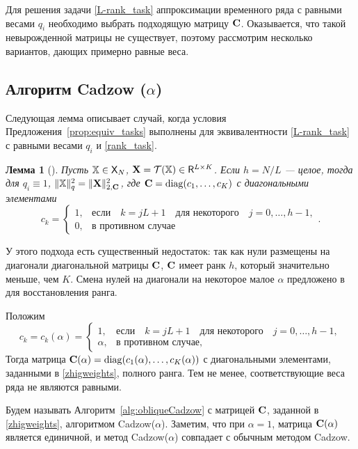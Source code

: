 \documentclass[12pt, specialist, subf,href,colorlinks=true,substylefile = spbu.rtx]{disser}
\newtheorem{lemma}{Лемма}
\theoremstyle{remark}
\theoremstyle{definition}
\begin{document}
Для решения задачи \eqref{L-rank_task} аппроксимации временного ряда с равными весами $q_i$ необходимо выбрать подходящую матрицу $\mathbf{C}$. Оказывается, что такой невырожденной матрицы не существует, поэтому рассмотрим несколько вариантов, дающих примерно равные веса.

\subsection{Алгоритм Cadzow ($\alpha$)}
\label{sec:cadzow_alpha}
Следующая лемма описывает случай, когда условия Предложения~\ref{prop:equiv_tasks} выполнены для эквивалентности \eqref{L-rank_task} с равными весами $q_i$ и \eqref{rank_task}.

\begin{lemma}[\cite{Gillard2014}]
\label{zhiglemma}
Пусть $\mathbb{X} \in \mathsf{X}_N$, $\mathbf{X} = \mathcal{T}(\mathbb{X}) \in \mathsf{R}^{L \times K}$. Если $h = N/L$ --- целое, тогда для $q_i\equiv 1$,  $\|\mathbb{X}\|^2_q = \|\mathbf{X}\|^2_{2, \mathbf{C}}$, где $\mathbf{C}=\mathop{\mathrm{diag}}(c_1,\ldots,c_K)$ с диагональными элементами
\begin{equation*}
c_k = \begin{cases}
1, & \text{если} \quad k = jL+1 \quad \text{для некоторого} \quad j = 0, \ldots, h-1, \\
0, & \text{в противном случае}
\end{cases}.
\end{equation*}
\end{lemma}

У этого подхода есть существенный недостаток: так как нули размещены на диагонали диагональной матрицы $\mathbf{C}$, $\mathbf{C}$ имеет ранк $h$, который значительно меньше, чем $K$. Смена нулей на диагонали на некоторое малое $\alpha$ предложено в \cite{Gillard2014} для восстановления ранга.

Положим
\begin{equation}\label{zhigweights}
c_k = c_k(\alpha) = \begin{cases}
1, & \text{если} \quad k = jL+1 \quad \text{для некоторого} \quad j = 0, \ldots, h-1, \\
\alpha, & \text{в противном случае,}
\end{cases}
\end{equation}
Тогда матрица $\mathbf{C}(\alpha)=\mathop{\mathrm{diag}}(c_1(\alpha),\ldots,c_K(\alpha))$ с диагональными элементами, заданными в \eqref{zhigweights}, полного ранга.
Тем не менее, соответствующие веса ряда не являются равными.

Будем называть Алгоритм~\ref{alg:obliqueCadzow} с матрицей $\mathbf{C}$, заданной в \eqref{zhigweights}, алгоритмом Cadzow($\alpha$). Заметим, что при $\alpha = 1$, матрица $\mathbf{C}(\alpha)$ является единичной, и метод Cadzow($\alpha$) совпадает с обычным методом Cadzow.
\end{document}
